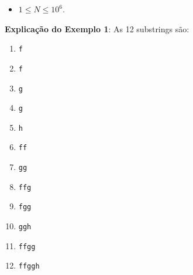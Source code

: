 \begin{itemize}
\item $1 \leq N \leq 10^6$.
\end{itemize}

\sampleio

\bigskip
\textbf{Explicação do Exemplo 1}: As 12 substrings são:

\begin{multicols}{2}
\begin{enumerate}
	\item {\tt f}
	\item {\tt f}
	\item {\tt g}
	\item {\tt g}
	\item {\tt h}
	\item {\tt ff}
	\item {\tt gg}
	\item {\tt ffg}
	\item {\tt fgg}
	\item {\tt ggh}
	\item {\tt ffgg}
	\item {\tt ffggh}
\end{enumerate}
\end{multicols}

